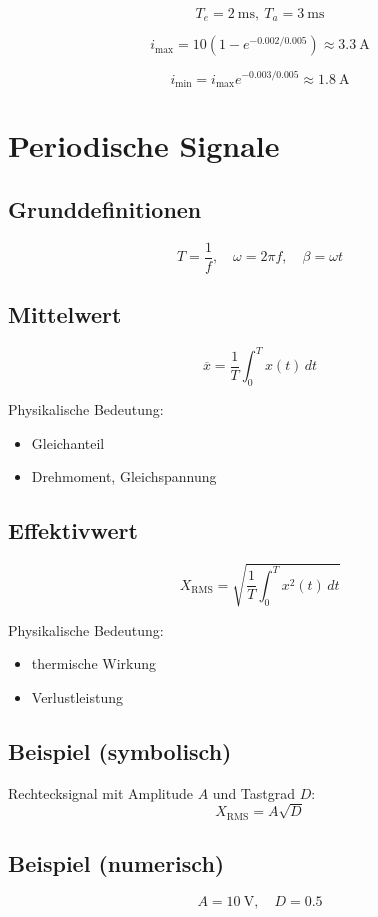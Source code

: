 \documentclass[a4paper,11pt]{article}
\begin{document}
\[
T_e=\SI{2}{\milli\second},\ T_a=\SI{3}{\milli\second}
\]

\[
i_{\max}=10\left(1-e^{-0.002/0.005}\right)\approx\SI{3.3}{\ampere}
\]

\[
i_{\min}=i_{\max}e^{-0.003/0.005}\approx\SI{1.8}{\ampere}
\]

\section{Periodische Signale}

\subsection{Grunddefinitionen}
\[
T=\frac{1}{f},\quad \omega=2\pi f,\quad \beta=\omega t
\]

\subsection{Mittelwert}
\[
\overline{x}=\frac{1}{T}\int_0^T x(t)\,dt
\]

Physikalische Bedeutung:
\begin{itemize}
  \item Gleichanteil
  \item Drehmoment, Gleichspannung
\end{itemize}

\subsection{Effektivwert}
\[
X_{\mathrm{RMS}}=\sqrt{\frac{1}{T}\int_0^T x^2(t)\,dt}
\]

Physikalische Bedeutung:
\begin{itemize}
  \item thermische Wirkung
  \item Verlustleistung
\end{itemize}

\subsection*{Beispiel (symbolisch)}
Rechtecksignal mit Amplitude $A$ und Tastgrad $D$:
\[
X_{\mathrm{RMS}}=A\sqrt{D}
\]

\subsection*{Beispiel (numerisch)}
\[
A=\SI{10}{\volt},\quad D=0.5
\]
\end{document}
